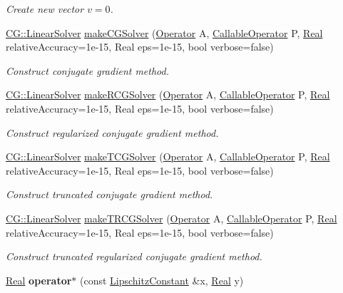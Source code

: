 \begin{DoxyCompactItemize}
\begin{DoxyCompactList}\small\item\em Create new vector $v=0$. \end{DoxyCompactList}\item 
\hyperlink{classSpacy_1_1CG_1_1LinearSolver}{C\-G\-::\-Linear\-Solver} \hyperlink{namespaceSpacy_a158f06b6790d44613c6533fbd3822e6a}{make\-C\-G\-Solver} (\hyperlink{classSpacy_1_1Operator}{Operator} A, \hyperlink{namespaceSpacy_a022a87afa759e18781dd2aea9a80cd73}{Callable\-Operator} P, \hyperlink{classSpacy_1_1Real}{Real} relative\-Accuracy=1e-\/15, Real eps=1e-\/15, bool verbose=false)
\begin{DoxyCompactList}\small\item\em Construct conjugate gradient method. \end{DoxyCompactList}\item 
\hyperlink{classSpacy_1_1CG_1_1LinearSolver}{C\-G\-::\-Linear\-Solver} \hyperlink{namespaceSpacy_af70adbdd6fafbe87bd7c79be078851d6}{make\-R\-C\-G\-Solver} (\hyperlink{classSpacy_1_1Operator}{Operator} A, \hyperlink{namespaceSpacy_a022a87afa759e18781dd2aea9a80cd73}{Callable\-Operator} P, \hyperlink{classSpacy_1_1Real}{Real} relative\-Accuracy=1e-\/15, Real eps=1e-\/15, bool verbose=false)
\begin{DoxyCompactList}\small\item\em Construct regularized conjugate gradient method. \end{DoxyCompactList}\item 
\hyperlink{classSpacy_1_1CG_1_1LinearSolver}{C\-G\-::\-Linear\-Solver} \hyperlink{namespaceSpacy_a8c2664d93c0a0049cd3849a3a0c973a8}{make\-T\-C\-G\-Solver} (\hyperlink{classSpacy_1_1Operator}{Operator} A, \hyperlink{namespaceSpacy_a022a87afa759e18781dd2aea9a80cd73}{Callable\-Operator} P, \hyperlink{classSpacy_1_1Real}{Real} relative\-Accuracy=1e-\/15, Real eps=1e-\/15, bool verbose=false)
\begin{DoxyCompactList}\small\item\em Construct truncated conjugate gradient method. \end{DoxyCompactList}\item 
\hyperlink{classSpacy_1_1CG_1_1LinearSolver}{C\-G\-::\-Linear\-Solver} \hyperlink{namespaceSpacy_af214c1f5a7c2e48d16370a7a386ca8df}{make\-T\-R\-C\-G\-Solver} (\hyperlink{classSpacy_1_1Operator}{Operator} A, \hyperlink{namespaceSpacy_a022a87afa759e18781dd2aea9a80cd73}{Callable\-Operator} P, \hyperlink{classSpacy_1_1Real}{Real} relative\-Accuracy=1e-\/15, Real eps=1e-\/15, bool verbose=false)
\begin{DoxyCompactList}\small\item\em Construct truncated regularized conjugate gradient method. \end{DoxyCompactList}\item 
\hypertarget{namespaceSpacy_a81f372bdfa76c83a44edab9f33c2e8c8}{\hyperlink{classSpacy_1_1Real}{Real} {\bfseries operator$\ast$} (const \hyperlink{classSpacy_1_1LipschitzConstant}{Lipschitz\-Constant} \&x, \hyperlink{classSpacy_1_1Real}{Real} y)}\label{namespaceSpacy_a81f372bdfa76c83a44edab9f33c2e8c8}


\end{DoxyCompactItemize}
